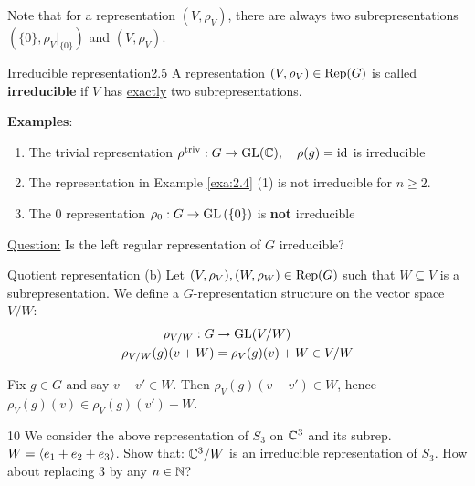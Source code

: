 \documentclass[twoside = false,	%
		headsepline,		%
		parskip = true,
		]{scrbook}						%
\begin{document}
        Note that for a representation $(V,\rho_V)$, there are always two subrepresentations $(\{0\},\rho_V|_{\{0\}})$ and $(V,\rho_V)$.
        
        \begin{definition}{Irreducible representation}{2.5}
            A representation $(V,\rho_V) \in \mathrm{Rep}(G)$ is called \textbf{irreducible} if $V$ has \underline{exactly} two subrepresentations.
        \end{definition}
        
        \textbf{Examples}:
        \begin{enumerate}
            \item The trivial representation $\rho^{\text{triv}}: G \to \mathrm{GL}(\mathbb C), \quad \rho(g) = \mathrm{id} $ is irreducible
            \item The representation in Example \ref{exa:2.4} (1) is not irreducible for $n \geq 2$.
            \item The $0$ representation $\rho_{0}: G \to \mathrm{GL}\left( \{0\}\right)$ is \textbf{not} irreducible
        \end{enumerate}
    
    \underline{Question:} Is the left regular representation of $G$ irreducible?
    \begin{definition*}
    {Quotient representation (b)}
        Let $(V,\rho_V), (W,\rho_W) \in \mathrm{Rep}(G)$ such that $W \subseteq V$ is a subrepresentation. We define a $G$-representation structure on the vector space $V/W:$
        \begin{equation*}
        \begin{split}
            \rho_{V/W}: G &\to \mathrm{GL}(V/W) \\
                        \rho_{V/W}(g)(v+W) &= \rho_V(g)(v) + W \in V/W
        \end{split}
        \end{equation*}
    \end{definition*}
    
    Fix $g \in G$ and say $v - v' \in W$. Then $\rho_V(g)(v-v') \in W$, hence $\rho_V(g)(v) \in \rho_V(g)(v') + W$.
    
    \begin{exercise}{}{10}
        We consider the above representation of $S_3$ on $\mathbb C^3$ and its subrep. $W = \left\langle e_1 + e_2 + e_3\right\rangle$. Show that: $\mathbb C^3/W$ is an irreducible representation of $S_3$. How about replacing $3$ by any $n \in \mathbb N$?
    \end{exercise}
\end{document}
